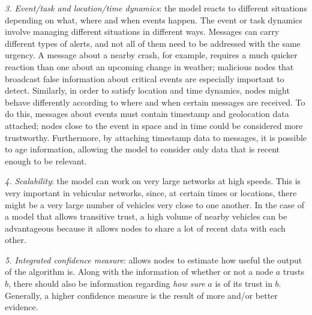 \textit{3. Event/task and location/time dynamics}: the model reacts to different situations depending on what, where and when events happen.
The event or task dynamics involve managing different situations in different ways.
Messages can carry different types of alerts, and not all of them need to be addressed with the same urgency.
A message about a nearby crash, for example, requires a much quicker reaction than one about an upcoming change in weather; malicious nodes that broadcast false information about critical events are especially important to detect.
Similarly, in order to satisfy location and time dynamics, nodes might behave differently according to where and when certain messages are received.
To do this, messages about events must contain timestamp and geolocation data attached; nodes close to the event in space and in time could be considered more trustworthy. 
Furthermore, by attaching timestamp data to messages, it is possible to age information, allowing the model to consider only data that is recent enough to be relevant.

\textit{4. Scalability}: the model can work on very large networks at high speeds.
This is very important in vehicular networks, since, at certain times or locations, there might be a very large number of vehicles very close to one another. 
In the case of a model that allows transitive trust, a high volume of nearby vehicles can be advantageous because it allows nodes to share a lot of recent data with each other.


\textit{5. Integrated confidence measure}: allows nodes to estimate how useful the output of the algorithm is.
Along with the information of whether or not a node $a$ trusts $b$, there should also be information regarding \textit{how sure} $a$ is of its trust in $b$.
Generally, a higher confidence measure is the result of more and/or better evidence.

